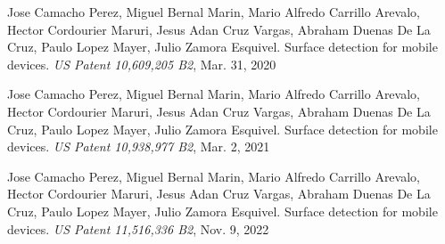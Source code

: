
\begin{bibsection}

  \item Jose Camacho Perez, Miguel Bernal Marin, Mario Alfredo Carrillo
	Arevalo, Hector Cordourier Maruri, Jesus Adan Cruz Vargas, Abraham
	Duenas De La Cruz, Paulo Lopez Mayer, Julio Zamora Esquivel.
	Surface detection for mobile devices.
	\emph{US Patent 10,609,205 B2}, Mar. 31, 2020

  \item Jose Camacho Perez, Miguel Bernal Marin, Mario Alfredo Carrillo
	Arevalo, Hector Cordourier Maruri, Jesus Adan Cruz Vargas, Abraham
	Duenas De La Cruz, Paulo Lopez Mayer, Julio Zamora Esquivel.
	Surface detection for mobile devices.
	\emph{US Patent 10,938,977 B2}, Mar. 2, 2021

  \item Jose Camacho Perez, Miguel Bernal Marin, Mario Alfredo Carrillo
	Arevalo, Hector Cordourier Maruri, Jesus Adan Cruz Vargas, Abraham
	Duenas De La Cruz, Paulo Lopez Mayer, Julio Zamora Esquivel.
	Surface detection for mobile devices.
	\emph{US Patent 11,516,336 B2}, Nov. 9, 2022

\end{bibsection}
